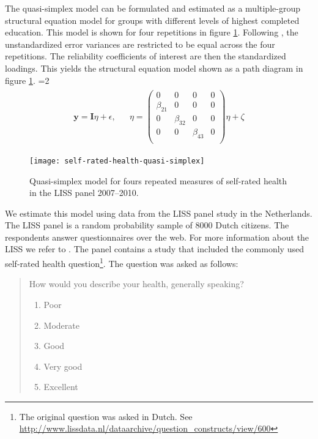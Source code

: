 \documentclass[a4paper, 11pt]{article}
\newcommand{\0}{\boldsymbol{0}}
\begin{document}
The quasi-simplex model can be formulated and estimated as a multiple-group structural equation model for groups with different  levels of highest completed education. This model is shown for four repetitions in figure 
\ref{fig:model}. Following \cite{wiley35wiley}, the unstandardized error variances are restricted to be equal across the four repetitions. The reliability coefficients of interest are then the standardized loadings. This yields the  structural equation model shown as a path diagram in figure \ref{fig:model}.
=2
\begin{eqnarray*}\begin{split}
\textbf{y} =  \textbf{I} {\eta} + \epsilon,& &
{\eta} = \begin{pmatrix}
	0 & 0 & 0 & 0\\
	\beta_{21} & 0 & 0 & 0\\
	0 & \beta_{32} & 0 & 0\\
	0 & 0 & \beta_{43} & 0\\	
\end{pmatrix} {\eta} + \zeta
\end{split}
\end{eqnarray*}
\fi


\begin{figure}[bt]\begin{center}
\caption{Quasi-simplex model for fours repeated measures of self-rated health in the LISS panel 2007--2010.}
\label{fig:model}
\texttt{[image: self-rated-health-quasi-simplex]}
\end{center}
\end{figure}

We estimate this model using data from the LISS panel study in the Netherlands. The LISS panel is a random probability sample 
of 8000 Dutch citizens. The respondents answer questionnaires over the web. For more information about the LISS we refer to \cite{scherpenzeel2011data}.
The  panel contains a study that included the commonly used self-rated health question\footnote{The original question was asked in Dutch. See \url{http://www.lissdata.nl/dataarchive/question_constructs/view/600}}. The question was asked as follows:
\begin{quote}
	How would you describe your health, generally speaking?
	
	\begin{enumerate}  \setlength{\itemsep}{0pt}  \setlength{\parskip}{0pt}
  \setlength{\parsep}{0pt}
		\item Poor
		\item Moderate
		\item Good
		\item Very good
		\item Excellent
	\end{enumerate}
\end{quote}
\end{document}

